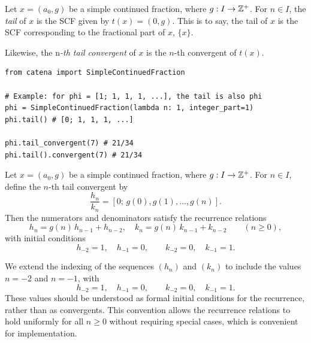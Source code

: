 \begin{definition}[Tail]
    Let $x = (a_0, g)$ be a simple continued fraction, where $g: I \to \mathbb{Z}^+$. For $n \in I$, the 
    \textit{tail} of $x$ is the SCF given by $t(x) = (0, g)$. This is to say, the tail of $x$ is the SCF 
    corresponding to the fractional part of $x$, $\{x\}$.

    Likewise, the n\textit{-th tail convergent} of $x$ is the $n$-th convergent of $t(x)$.
\end{definition}

\begin{catenadef}
\begin{lstlisting}[style=python]
from catena import SimpleContinuedFraction

# Example: for phi = [1; 1, 1, 1, ...], the tail is also phi
phi = SimpleContinuedFraction(lambda n: 1, integer_part=1)
phi.tail() # [0; 1, 1, 1, ...]

phi.tail_convergent(7) # 21/34
phi.tail().convergent(7) # 21/34
\end{lstlisting}
\end{catenadef}

\begin{theorem}
    Let $x = (a_0, g)$ be a simple continued fraction, where $g: I \to \mathbb{Z}^+$. 
    For $n \in I$, define the $n$-th tail convergent by
    \[
        \frac{h_n}{k_n}
        =
        [0;\, g(0), g(1), \ldots, g(n)].
    \]
    Then the numerators and denominators satisfy the recurrence relations
    \[
        h_n = g(n)\, h_{n-1} + h_{n-2}, \quad 
        k_n = g(n)\, k_{n-1} + k_{n-2} \qquad (n \geq 0),
    \]
    with initial conditions
    \[
        h_{-2} = 1,\quad h_{-1} = 0, \qquad
        k_{-2} = 0,\quad k_{-1} = 1.
    \]
\end{theorem}

\begin{remark}
  We extend the indexing of the sequences $(h_n)$ and $(k_n)$ to include 
  the values $n = -2$ and $n = -1$, with
  \[
      h_{-2} = 1,\quad h_{-1} = 0, \qquad
      k_{-2} = 0,\quad k_{-1} = 1.
  \]
  These values should be understood as formal initial conditions for the 
  recurrence, rather than as convergents. This convention allows the 
  recurrence relations to hold uniformly for all $n \geq 0$ without requiring 
  special cases, which is convenient for implementation.
\end{remark}

